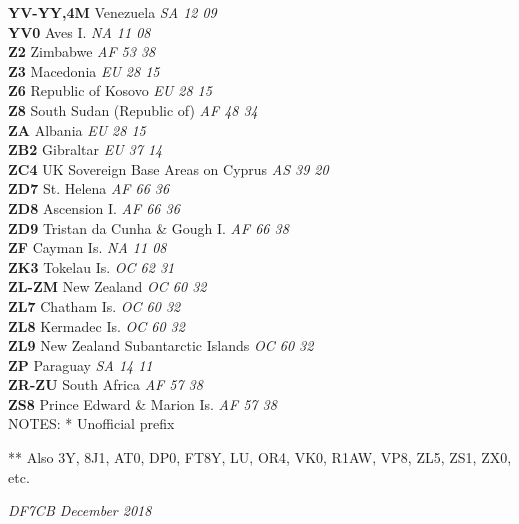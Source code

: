 ﻿\documentclass[landscape,a4paper]{article}
\begin{document}
\begin{multicols}{6}
\textbf{YV-YY,4M                } Venezuela                          \emph{ SA     12     09    } \\
\textbf{YV0                     } Aves I.                            \emph{ NA     11     08    } \\
\textbf{Z2                      } Zimbabwe                           \emph{ AF     53     38    } \\
\textbf{Z3                      } Macedonia                          \emph{ EU     28     15    } \\
\textbf{Z6                      } Republic of Kosovo                 \emph{ EU     28     15    } \\
\textbf{Z8                      } South Sudan (Republic of)          \emph{ AF     48     34    } \\
\textbf{ZA                      } Albania                            \emph{ EU     28     15    } \\
\textbf{ZB2                     } Gibraltar                          \emph{ EU     37     14    } \\
\textbf{ZC4                     } UK Sovereign Base Areas on Cyprus  \emph{ AS     39     20    } \\
\textbf{ZD7                     } St. Helena                         \emph{ AF     66     36    } \\
\textbf{ZD8                     } Ascension I.                       \emph{ AF     66     36    } \\
\textbf{ZD9                     } Tristan da Cunha \& Gough I.       \emph{ AF     66     38    } \\
\textbf{ZF                      } Cayman Is.                         \emph{ NA     11     08    } \\
\textbf{ZK3                     } Tokelau Is.                        \emph{ OC     62     31    } \\
\textbf{ZL-ZM                   } New Zealand                        \emph{ OC     60     32    } \\
\textbf{ZL7                     } Chatham Is.                        \emph{ OC     60     32    } \\
\textbf{ZL8                     } Kermadec Is.                       \emph{ OC     60     32    } \\
\textbf{ZL9                     } New Zealand Subantarctic Islands   \emph{ OC     60     32    } \\
\textbf{ZP                      } Paraguay                           \emph{ SA     14     11    } \\
\textbf{ZR-ZU                   } South Africa                       \emph{ AF     57     38    } \\
\textbf{ZS8                     } Prince Edward \& Marion Is.        \emph{ AF     57     38    } \\

\noindent
    NOTES:
    *    Unofficial prefix

\noindent
    **    Also 3Y, 8J1, AT0, DP0, FT8Y, LU, OR4, VK0, R1AW, VP8, ZL5, ZS1, ZX0, etc.

\noindent
\emph{DF7CB December 2018}
\end{multicols}
\end{document}
